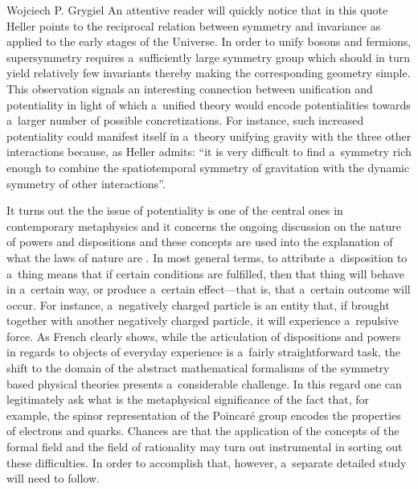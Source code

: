 \begin{artengenv}{Wojciech P. Grygiel}
An attentive reader will quickly notice that in this quote Heller points to the reciprocal relation between symmetry and invariance as applied to the early stages of the Universe. In order to unify bosons and fermions, supersymmetry requires a~sufficiently large symmetry group which should in turn yield relatively few invariants thereby making the corresponding geometry simple. This observation signals an interesting connection between unification and potentiality in light of which a~unified theory would encode potentialities towards a~larger number of possible concretizations. For instance, such increased potentiality could manifest itself in a~theory unifying gravity with the three other interactions because, as Heller 
\parencite*[][p.63]{heller_poczatek_2002} %
 admits: ``it is very difficult to find a~symmetry rich enough to combine the spatiotemporal symmetry of gravitation with the dynamic symmetry of other interactions''.



It turns out the the issue of potentiality is one of the central ones in contemporary metaphysics and it concerns the ongoing discussion on the nature of powers and dispositions and these concepts are used into the explanation of what the laws of nature are 
\parencite[e.g][]{friend_dispositions_2023}. %
 In most general terms, to attribute a~disposition to a~thing means that if certain conditions are fulfilled, then that thing will behave in a~certain way, or produce a~certain effect---that is, that a~certain outcome will occur. For instance, a~negatively charged particle is an entity that, if brought together with another negatively charged particle, it will experience a~repulsive force. As French 
\parencite*[][]{french_doing_2020} %
 clearly shows, while the articulation of dispositions and powers in regards to objects of everyday experience is a~fairly straightforward task, the shift to the domain of the abstract mathematical formalisms of the symmetry based physical theories presents a~considerable challenge. In this regard one can legitimately ask what is the metaphysical significance of the fact that, for example, the spinor representation of the Poincaré group encodes the properties of electrons and quarks. Chances are that the application of the concepts of the formal field and the field of rationality may turn out instrumental in sorting out these difficulties. In order to accomplish that, however, a~separate detailed study will need to follow.




\end{artengenv}
